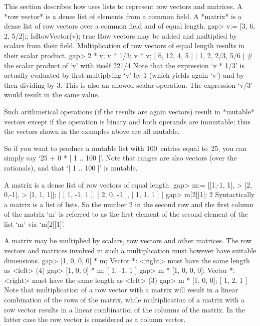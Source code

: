%
This section describes how {\GAP} uses lists to represent row vectors and
matrices. A *row vector* is a dense list of elements from a common field.
A *matrix* is a dense list of row vectors over a common field and of
equal length.
\beginexample
gap> v:= [3, 6, 2, 5/2];;  IsRowVector(v);
true
\endexample
Row vectors  may be  added and multiplied   by scalars from  their field.
Multiplication of   row vectors of  equal length  results in their scalar
product.
\beginexample
gap> 2 * v;  v * 1/3;  v * v;
[ 6, 12, 4, 5 ]
[ 1, 2, 2/3, 5/6 ]
# the scalar product of `v' with itself
221/4
\endexample
Note  that   the expression `v   *  1/3' is   actually evaluated by first
multiplying `v' by 1 (which yields again `v')  and by then dividing by 3.
This  is  also an allowed scalar   operation.  The expression `v/3' would
result in  the same value.

Such arithmetical operations (if the results are again vectors)
result in *mutable* vectors except if the operation is binary
and both operands are immutable;
thus the vectors shown in the examples above are all mutable.

So if you want to produce a mutable list with 100~entries equal to~25,
you can simply say `25  + 0 * [ 1 .. 100 ]'.
Note that ranges are also vectors (over the rationals),
and that `[ 1 .. 100 ]' is mutable.


%

A matrix is a dense list of row vectors of equal length.
\beginexample
gap> m:= [[1,-1, 1],
>         [2, 0,-1],
>         [1, 1, 1]];
[ [ 1, -1, 1 ], [ 2, 0, -1 ], [ 1, 1, 1 ] ]
gap> m[2][1];
2
\endexample
Syntactically a matrix is a list of lists. So the number  2 in the second
row  and the first  column of the matrix `m'  is referred to as the first
element of the second element of the list `m' via `m[2][1]'.

A matrix may be multiplied by scalars, row vectors and other matrices.
The row vectors and matrices involved in such a multiplication must
however have suitable dimensions.
\begintt
gap> [1, 0, 0, 0] * m;
Vector *: <right> must have the same length as <left> (4)
gap> [1, 0, 0] * m;
[ 1, -1, 1 ]
gap> m * [1, 0, 0, 0];
Vector *: <right> must have the same length as <left> (3)
\endtt
\beginexample
gap> m * [1, 0, 0];
[ 1, 2, 1 ]
\endexample
Note that multiplication  of a row vector with  a matrix will result in a
linear combination of the  rows of the  matrix, while multiplication of a
matrix with a row  vector results in  a linear combination of the columns
of the  matrix. In  the latter case  the  row vector is considered   as a
column vector.

